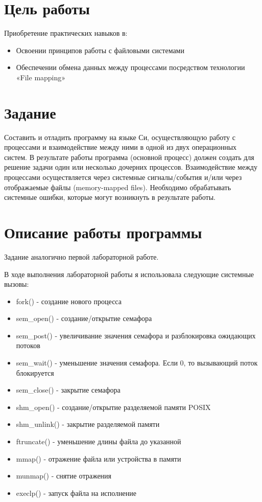 \documentclass[a4paper, 12pt]{article}
\begin{document}
\section{Цель работы}
Приобретение практических навыков в:
\begin{itemize}
  \item Освоении принципов работы с файловыми системами
  \item Обеспечении обмена данных между процессами посредством технологии «File mapping»
\end{itemize}

\section{Задание}
Составить и отладить программу на языке Си, осуществляющую работу с процессами и взаимодействие между ними в одной из двух операционных систем. В результате работы программа (основной процесс) должен создать для решение задачи один или несколько дочерних процессов. Взаимодействие между процессами осуществляется через системные сигналы/события и/или через отображаемые файлы (memory-mapped files).
Необходимо обрабатывать системные ошибки, которые могут возникнуть в результате работы.

\section{Описание работы программы}
Задание аналогично первой лабораторной работе.

В ходе выполнения лабораторной работы я использовала следующие системные вызовы:
\begin{itemize}
  \item fork() - создание нового процесса
  \item sem\_open() - создание/открытие семафора
  \item sem\_post() - увеличивание значения семафора и разблокировка ожидающих потоков
  \item sem\_wait() - уменьшение значения семафора. Если 0, то вызывающий поток блокируется 
  \item sem\_close() - закрытие семафора
  \item shm\_open() - создание/открытие разделяемой памяти POSIX
  \item shm\_unlink() - закрытие разделяемой памяти
  \item ftruncate() - уменьшение длины файла до указанной  
  \item mmap() - отражение файла или устройства в памяти
  \item munmap() - снятие отражения
  \item execlp() - запуск файла на исполнение
  
\end{itemize}
\end{document}
